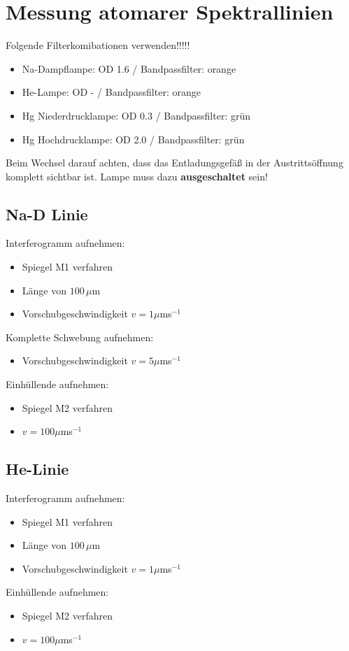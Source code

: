 \documentclass[a4paper, twoside]{article}
\begin{document}
\section{Messung atomarer Spektrallinien}
Folgende Filterkomibationen verwenden!!!!!
\begin{itemize}
\item Na-Dampflampe: OD 1.6 / Bandpassfilter: orange
\item He-Lampe: OD - / Bandpassfilter: orange
\item Hg Niederdrucklampe: OD 0.3 / Bandpassfilter: grün
\item Hg Hochdrucklampe: OD 2.0 / Bandpassfilter: grün
\end{itemize}
Beim Wechsel darauf achten, dass das Entladungsgefäß in der Austrittsöffnung komplett sichtbar ist. Lampe muss dazu \textbf{ausgeschaltet} sein!
\subsection{Na-D Linie}
Interferogramm aufnehmen:
\begin{itemize}
	\item Spiegel M1 verfahren
	\item Länge von $100\,\mu$m
	\item Vorschubgeschwindigkeit $v=1\mu$ms$^{-1}$
\end{itemize}
Komplette Schwebung aufnehmen:
\begin{itemize}
	\item Vorschubgeschwindigkeit $v=5\mu$ms$^{-1}$
\end{itemize}
Einhüllende aufnehmen:
\begin{itemize}
	\item Spiegel M2 verfahren
	\item $v=100\mu$ms$^{-1}$
\end{itemize}
\subsection{He-Linie}
Interferogramm aufnehmen:
\begin{itemize}
	\item Spiegel M1 verfahren
	\item Länge von $100\,\mu$m
	\item Vorschubgeschwindigkeit $v=1\mu$ms$^{-1}$
\end{itemize}
Einhüllende aufnehmen:
\begin{itemize}
	\item Spiegel M2 verfahren
	\item $v=100\mu$ms$^{-1}$
\end{itemize}
\end{document}
